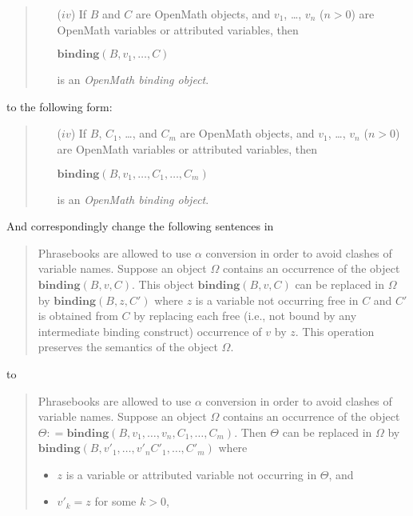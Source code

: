\documentclass{llncs}
\begin{document}
{\begin{quote}
  \begin{itemize}
  \item[($iv$)] If $B$ and $C$ are OpenMath objects, and $v_1$, \ldots, $v_n$ ($n>0$)
    are OpenMath variables or attributed variables, then
    \begin{center}
      $\mathbf{binding}(B, v_1,\ldots,C)$
    \end{center}
    is an {\emph{OpenMath binding object}}.
  \end{itemize}
\end{quote}
to the following form:
\begin{quote}
  \begin{itemize}
  \item[($iv$)] If $B$, $C_1$, \ldots, and $C_m$ are OpenMath objects, and $v_1$, \ldots,
    $v_n$ ($n>0$) are OpenMath variables or attributed variables, then
    \begin{center}
      $\mathbf{binding}(B, v_1,\ldots,C_1,\ldots,C_m)$
    \end{center}
    is an {\emph{OpenMath binding object}}.
  \end{itemize}
\end{quote}
And correspondingly change the following sentences in~\cite[section 2.2]{OpenMath2004a}
\begin{quote}
  Phrasebooks are allowed to use $\alpha$ conversion in order to avoid clashes of variable
  names. Suppose an object $\Omega$ contains an occurrence of the object
  $\mathbf{binding}(B,v,C)$.  This object $\mathbf{binding}(B,v,C)$ can be replaced in
  $\Omega$ by $\mathbf{binding}(B,z,C')$ where $z$ is a variable not occurring free in $C$
  and $C'$ is obtained from $C$ by replacing each free (i.e., not bound by any
  intermediate binding construct) occurrence of $v$ by $z$.  This operation preserves the
  semantics of the object $\Omega$.
\end{quote}
to 
\begin{quote}
  Phrasebooks are allowed to use $\alpha$ conversion in order to avoid clashes of variable
  names. Suppose an object $\Omega$ contains an occurrence of the object
  $\Theta\colon=\mathbf{binding}(B,v_1,\dots,v_n,C_1,\ldots,C_m)$.  Then $\Theta$ can be
  replaced in $\Omega$ by $\mathbf{binding}(B,v'_1,\ldots,v'_{n} C'_1,\ldots,C'_m)$ where
  \begin{itemize}
  \item $z$ is a variable or attributed variable not occurring in $\Theta$, and
  \item $v'_k=z$ for some $k>0$,

\end{itemize}
\end{quote}}
\end{document}
